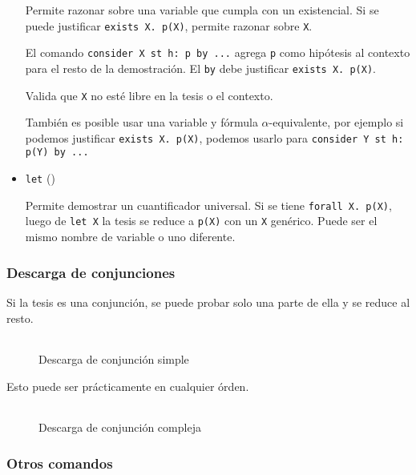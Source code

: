 \begin{itemize}
    Permite razonar sobre una variable que cumpla con un existencial. Si se
    puede justificar \lstinline{exists X. p(X)}, permite razonar sobre
    \lstinline{X}.

    El comando \lstinline{consider X st h: p by ...} agrega \lstinline{p} como
    hipótesis al contexto para el resto de la demostración. El \lstinline{by}
    debe justificar \lstinline{exists X. p(X)}.

    Valida que \lstinline{X} no esté libre en la tesis o el contexto.

    También es posible usar una variable y fórmula $\alpha$-equivalente, por
    ejemplo si podemos justificar \lstinline{exists X. p(X)}, podemos usarlo
    para \lstinline{consider Y st h: p(Y) by ...}

    \item \lstinline{let} ()
    
    Permite demostrar un cuantificador universal. Si se tiene
    \lstinline{forall X. p(X)}, luego de \lstinline{let X} la tesis se reduce a
    \lstinline{p(X)} con un \lstinline{X} genérico. Puede ser el mismo nombre de
    variable o uno diferente.

\end{itemize}

\subsubsection{Descarga de conjunciones}\label{ppa:sec:and-intro}

Si la tesis es una conjunción, se puede probar solo una parte de ella y se
reduce al resto.

\begin{figure}[H]
    \centering
    \caption{Descarga de conjunción simple}
    \begin{tabular}{c}
        
    \end{tabular}
\end{figure}

Esto puede ser prácticamente en cualquier órden.

\begin{figure}[H]
    \centering
    \caption{Descarga de conjunción compleja}
    \begin{tabular}{c}
    
    \end{tabular}
\end{figure}


\subsubsection{Otros comandos}

